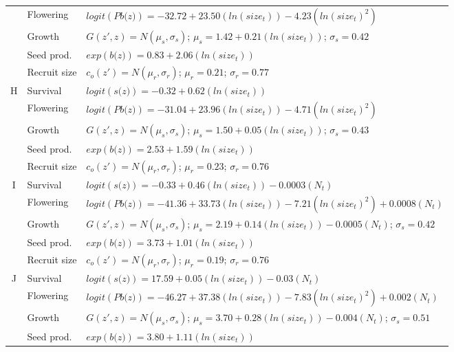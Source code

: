 \documentclass[12pt, letterpaper]{article}
\begin{document}
\begin{spacing}{1.3}
\begin{longtable}[ht!]{c|l|p{}}
         & Flowering  & $logit(\textit{Pb(z)})  = -32.72 + 23.50(ln(size_t)) -4.23 (ln(size_t)^2)$ \\
         \rowcolor[gray]{.95}& Growth  &  $G(z',z) = N(\mu_s, \sigma_s)$; $\mu_s = 1.42 + 0.21(ln(size_t))$; $\sigma_s = 0.42$\\
         & Seed prod.  & $exp(\textit{b(z)}) = 0.83 + 2.06 (ln(size_t))$  \\
         \rowcolor[gray]{.95}& Recruit size  &  $c_o(z') = N(\mu_r, \sigma_r)$; $\mu_r = 0.21$; $\sigma_r = 0.77$ \\
         \hline
        H &  Survival  &  $logit(\textit{s(z)})= -0.32 +0.62(ln(size_t))$ \\
         \rowcolor[gray]{.95}& Flowering  & $logit(\textit{Pb(z)})  = -31.04 + 23.96(ln(size_t)) -4.71 (ln(size_t)^2)$ \\
         & Growth  &  $G(z',z) = N(\mu_s, \sigma_s)$; $\mu_s = 1.50 + 0.05(ln(size_t))$; $\sigma_s = 0.43$\\
        \rowcolor[gray]{.95} & Seed prod.  & $exp(\textit{b(z)}) = 2.53 + 1.59 (ln(size_t))$  \\
         & Recruit size  &  $c_o(z') = N(\mu_r, \sigma_r)$; $\mu_r = 0.23$; $\sigma_r = 0.76$ \\
         \hline
        \rowcolor[gray]{.95}I &  Survival  &  $logit(\textit{s(z)})= -0.33 +0.46(ln(size_t)) - 0.0003 (N_t)$ \\
         & Flowering  & $logit(\textit{Pb(z)})  = -41.36 + 33.73(ln(size_t)) -7.21 (ln(size_t)^2) + 0.0008(N_t)$ \\
         \rowcolor[gray]{.95}& Growth  &  $G(z',z) = N(\mu_s, \sigma_s)$; $\mu_s = 2.19 + 0.14(ln(size_t)) - 0.0005(N_t)$; $\sigma_s = 0.42$\\
         & Seed prod.  & $exp(\textit{b(z)}) = 3.73 + 1.01(ln(size_t))$  \\
         \rowcolor[gray]{.95}& Recruit size  &  $c_o(z') = N(\mu_r, \sigma_r)$; $\mu_r = 0.19$; $\sigma_r = 0.76$ \\
         \hline
         J &  Survival  &  $logit(\textit{s(z)})= 17.59 +0.05(ln(size_t)) - 0.03 (N_t)$ \\
         \rowcolor[gray]{.95}& Flowering  & $logit(\textit{Pb(z)})  = -46.27 + 37.38(ln(size_t)) -7.83 (ln(size_t)^2) + 0.002(N_t)$ \\
         & Growth  &  $G(z',z) = N(\mu_s, \sigma_s)$; $\mu_s = 3.70 + 0.28(ln(size_t)) - 0.004(N_t)$; $\sigma_s = 0.51$\\
         \rowcolor[gray]{.95}& Seed prod.  & $exp(\textit{b(z)}) = 3.80 + 1.11(ln(size_t))$  \\

\end{longtable}
\end{spacing}
\end{document}
